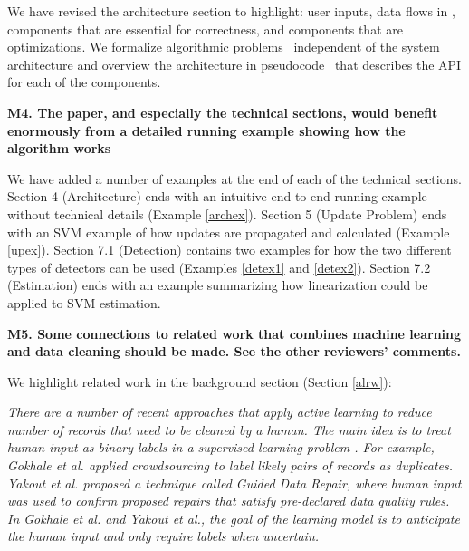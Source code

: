 
We have revised the architecture section  to highlight: user inputs, data flows in \sys, components that are essential for correctness, and components that are optimizations.
We formalize algorithmic problems~ independent of the system architecture and overview the architecture in pseudocode~ that describes the API for each of the components.



\vspace{0.5em}

\noindent\textbf{M4. The paper, and especially the technical sections, would benefit enormously from a detailed running example showing how the algorithm works}

We have added a number of examples at the end of each of the technical sections. Section 4 (Architecture) ends with an intuitive end-to-end running example without technical details (Example \ref{archex}).
Section 5 (Update Problem) ends with an SVM example of how updates are propagated and calculated (Example \ref{upex}).
Section 7.1 (Detection) contains two examples for how the two different types of detectors can be used (Examples \ref{detex1} and \ref{detex2}).
Section 7.2 (Estimation) ends with an example summarizing how linearization could be applied to SVM estimation.

\vspace{0.5em}

\noindent\textbf{M5. Some connections to related work that combines machine learning and data cleaning should be made. See the other reviewers' comments.}

We highlight related work in the background section (Section \ref{alrw}):

\emph{There are a number of recent approaches that apply active learning to reduce number of records that need to be cleaned by a human.
The main idea is to treat human input as binary labels in a supervised learning problem \cite{DBLP:journals/pvldb/MozafariSFJM14}.
For example, Gokhale et al. \cite{gokhale2014corleone} applied crowdsourcing to label likely pairs of records as duplicates.
Yakout et al. \cite{DBLP:journals/pvldb/YakoutENOI11} proposed a technique called Guided Data Repair, where human input was used to confirm proposed repairs that satisfy pre-declared data quality rules.
In Gokhale et al. and Yakout et al., the goal of the learning model is to anticipate the human input and only require labels when uncertain.}


